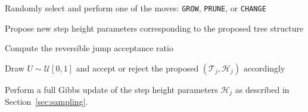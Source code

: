 \begin{algorithm}[tb]
\caption{Update of a single tree via reversible jump step}
\label{SingleTreeUpdate}


\vspace{1ex}

Randomly select and perform one of the moves: \texttt{GROW}, \texttt{PRUNE}, or \texttt{CHANGE}\;

\vspace{1ex}

Propose new step height parameters corresponding to the proposed tree structure\;

\vspace{1ex}

Compute the reversible jump acceptance ratio\;

\vspace{1ex}

Draw $U \sim \mathcal{U}[0,1]$ and accept or reject the proposed $(\mathcal{T}_j, \mathcal{H}_j)$ accordingly\;

\vspace{1ex}

Perform a full Gibbs update of the step height parameters $\mathcal{H}_j$ as described in Section~\ref{sec:sampling}.

\end{algorithm}